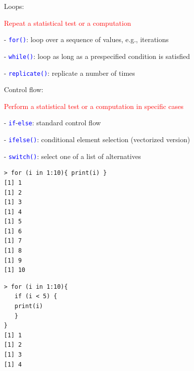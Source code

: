 \documentclass{presentatiesmetlogo}
\newcommand{\code}[1]{\textcolor{blue}{\texttt{#1}}}
\begin{document}
\bitem
\item Loops:
\bitemt
\item \textcolor{red}{Repeat a statistical test or a computation}
\bitemt
\item[-] \code{for()}: loop over a sequence of values, e.g., iterations
\item[-] \code{while()}: loop as long as a prespecified condition is satisfied
\item[-] \code{replicate()}: replicate a number of times
\eitemt
\eitemt
\item Control flow:
\bitemt
\item \textcolor{red}{Perform a statistical test or a computation in specific cases}
\bitemt
\item[-] \code{if}-\code{else}: standard control flow
\item[-] \code{ifelse()}: conditional element selection (vectorized version)
\item[-] \code{switch()}: select one of a list of alternatives
\eitemt
\eitemt
\eitem
\begin{verbatim}
> for (i in 1:10){ print(i) }
[1] 1
[1] 2
[1] 3
[1] 4
[1] 5
[1] 6
[1] 7
[1] 8
[1] 9
[1] 10
\end{verbatim}
\begin{verbatim}
> for (i in 1:10){
   if (i < 5) {
   print(i)
   }
}
[1] 1
[1] 2
[1] 3
[1] 4
\end{verbatim}
\end{document}
